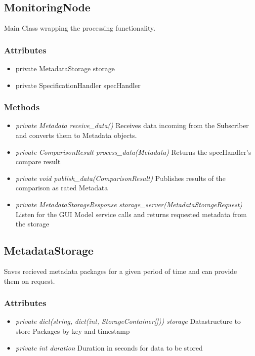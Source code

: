 
\subsection{MonitoringNode}
Main Class wrapping the processing functionality.

\subsubsection{Attributes}
\begin{itemize}
	\item private MetadataStorage storage
	\item private SpecificationHandler specHandler
\end{itemize}
\subsubsection{Methods}
\begin{itemize}
	\item \textit{private Metadata receive\_data()}
	Receives data incoming from the Subscriber and converts them to Metadata objects.
	\item \textit{private ComparisonResult process\_data(Metadata)}
	Returns the specHandler's compare result
	\item \textit{private void publish\_data(ComparisonResult)}
	Publishes results of the comparison as rated Metadata
	\item \textit{private MetadataStorageResponse storage\_server(MetadataStorageRequest)}
	Listen for the GUI Model service calls and returns requested metadata from the storage
\end{itemize}


\subsection{MetadataStorage}
Saves recieved metadata packages for a given period of time and can provide them on request.

\subsubsection{Attributes}
\begin{itemize}
	\item \textit{private dict(string, dict(int, StorageContainer[])) storage}
	Datastructure to store Packages by key and timestamp
	\item \textit{private int duration}
	Duration in seconds for data to be stored
\end{itemize}
